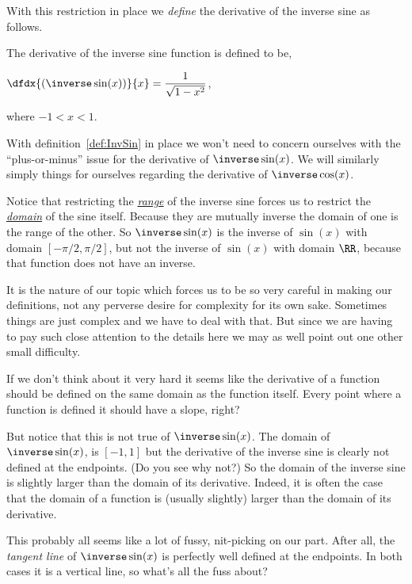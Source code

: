With this restriction in place we \emph{define} the derivative of the
inverse sine as follows.

\begin{mydefinition}
  \label{def:InvSin}
 The derivative of the inverse sine function is defined to be,\\
 \centerline{$\displaystyle\dfdx{(\inverse\sin(x))}{x}=\frac{1}{\sqrt{1-x^2}}$,} where $-1\lt
 x\lt 1$.
  \vskip-4mm{}
\end{mydefinition}
With definition~\ref{def:InvSin} in place
we won't need to concern ourselves with the ``plus-or-minus'' issue
for the derivative of  $\inverse\sin(x)$. We will similarly simply
things for ourselves regarding the derivative of $\inverse\cos(x)$.

\begin{Digression}
  Notice that restricting the \emph{\underline{range}} of the inverse
  sine forces us to restrict the \emph{\underline{domain}} of the sine
  itself. Because they are mutually inverse the domain of one is the
  range of the other. So $\inverse\sin(x)$ is the inverse of $\sin(x)$
  with domain $[-\pi/2, \pi/2]$, but \alert{not} the inverse of
  $\sin(x)$ with domain $\RR$, because that function does not have an
  inverse.

  It is the nature of our topic which forces us to be so very careful
  in making our definitions, not any perverse desire for complexity
  for its own sake. Sometimes things are just complex and we have to
  deal with that.  But since we are having to pay such close attention
  to the details here we may as well point out one other small
  difficulty.
  
  If we don't think about it very hard it seems like the derivative of
  a function should be defined on the same domain as the function
  itself. Every point where a function is defined it should have a
  slope, right?

  But notice that this is not true of $\inverse\sin(x)$. The domain of
  $\inverse\sin(x)$, is $[-1,1]$ but the derivative of the inverse
  sine is clearly not defined at the endpoints. (Do you see why not?)
  So the domain of the inverse sine is slightly larger than the domain
  of its derivative.  Indeed, it is often the case that the domain of
  a function is (usually slightly) larger than the domain of its
  derivative.

  This probably all seems like a lot of fussy, nit-picking on our
  part. After all, the \emph{tangent line} of $\inverse\sin(x)$ is
  perfectly well defined at the endpoints. In both cases it is a
  vertical line, so what's all the fuss about?


\end{Digression}
